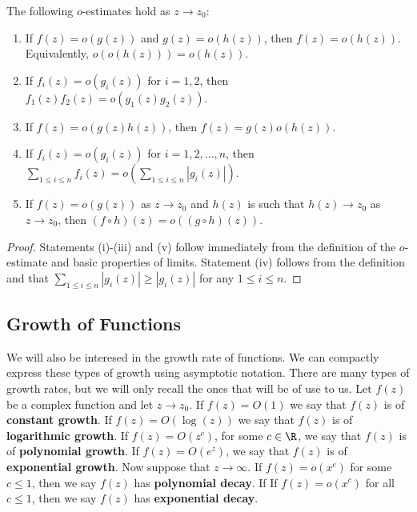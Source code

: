        \begin{proposition}\label{prop:Little_Oh_manipulations}
            The following $o$-estimates hold as $z \to z_{0}$:
            \begin{enumerate}[label=(\roman*)]
              \item If $f(z) = o(g(z))$ and $g(z) = o(h(z))$, then $f(z) = o(h(z))$. Equivalently, $o(o(h(z))) = o(h(z))$.
              \item If $f_{i}(z) = o(g_{i}(z))$ for $i = 1,2$, then $f_{1}(z)f_{2}(z) = o(g_{1}(z)g_{2}(z))$.
              \item If $f(z) = o(g(z)h(z))$, then $f(z) = g(z)o(h(z))$.
              \item If $f_{i}(z) = o(g_{i}(z))$ for $i = 1,2,\ldots,n$, then $\sum_{1 \le i \le n}f_{i}(z) = o\left(\sum_{1 \le i \le n}|g_{i}(z)|\right)$.
              \item If $f(z) = o(g(z))$ as $z \to z_{0}$ and $h(z)$ is such that $h(z) \to z_{0}$ as $z \to z_{0}$, then $(f \circ h)(z) = o((g \circ h)(z))$.
            \end{enumerate}
        \end{proposition}
        \begin{proof}
          Statements (i)-(iii) and (v) follow immediately from the definition of the $o$-estimate and basic properties of limits. Statement (iv) follows from the definition and that $\sum_{1 \le i \le n}|g_{i}(z)| \ge |g_{i}(z)|$ for any $1 \le i \le n$.
        \end{proof}
      \subsection*{Growth of Functions}
        We will also be interesed in the growth rate of functions. We can compactly express these types of growth using asymptotic notation. There are many types of growth rates, but we will only recall the ones that will be of use to us. Let $f(z)$ be a complex function and let $z \to z_{0}$. If $f(z) = O(1)$ we say that $f(z)$ is of \textbf{constant growth}. If $f(z) = O(\log(z))$ we say that $f(z)$ is of \textbf{logarithmic growth}. If $f(z) = O(z^{c})$, for some $c \in \R$, we say that $f(z)$ is of \textbf{polynomial growth}. If $f(z) = O(e^{z})$, we say that $f(z)$ is of \textbf{exponential growth}. Now suppose that $z \to \infty$. If $f(z) = o(x^{c})$ for some $c \le 1$, then we say $f(z)$ has \textbf{polynomial decay}. If If $f(z) = o(x^{c})$ for all $c \le 1$, then we say $f(z)$ has \textbf{exponential decay}.
